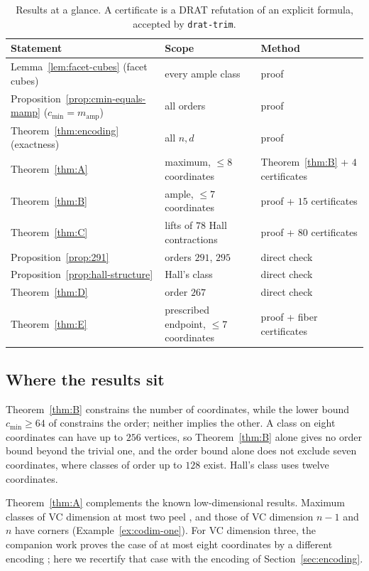 \documentclass[11pt]{article}
\numberwithin{equation}{section}
\theoremstyle{definition}
\theoremstyle{remark}
\newcommand{\cmin}{c_{\min}}
\newcommand{\mamp}{m_{\mathrm{amp}}}
\begin{document}
\begin{table}[t]
\centering
\small
\begin{tabular}{@{}p{}p{}p{}@{}}
\toprule
Statement & Scope & Method\\
\midrule
Lemma~\ref{lem:facet-cubes} (facet cubes) & every ample class & proof\\
Proposition~\ref{prop:cmin-equals-mamp} (\(\cmin=\mamp\)) & all orders & proof\\
Theorem~\ref{thm:encoding} (exactness) & all \(n,d\) & proof\\
Theorem~\ref{thm:A} & maximum, \(\le8\) coordinates & Theorem~\ref{thm:B} + \(4\) certificates\\
Theorem~\ref{thm:B} & ample, \(\le7\) coordinates & proof + \(15\) certificates\\
Theorem~\ref{thm:C} & lifts of \(78\) Hall contractions & proof + \(80\) certificates\\
Proposition~\ref{prop:291} & orders \(291\), \(295\) & direct check\\
Proposition~\ref{prop:hall-structure} & Hall's class & direct check\\
Theorem~\ref{thm:D} & order \(267\) & direct check\\
Theorem~\ref{thm:E} & prescribed endpoint, \(\le7\) coordinates & proof + fiber certificates\\
\bottomrule
\end{tabular}
\caption{Results at a glance.  A certificate is a DRAT refutation of an
explicit formula, accepted by \texttt{drat-trim}.}
\label{tab:glance}
\end{table}

\subsection{Where the results sit}

Theorem~\ref{thm:B} constrains the number of coordinates, while the lower
bound \(\cmin\ge64\) of \cite{BousquetDampReader} constrains the order;
neither implies the other.  A class on eight coordinates can have up to
\(256\) vertices, so Theorem~\ref{thm:B} alone gives no order bound beyond
the trivial one, and the order bound alone does not exclude seven
coordinates, where classes of order up to \(128\) exist.  Hall's class uses
twelve coordinates.

Theorem~\ref{thm:A} complements the known low-dimensional results.
Maximum classes of VC dimension at most two peel
\cite[Proposition~4.11]{ChalopiChepoiMoran22}, and those of VC dimension
\(n-1\) and \(n\) have corners (Example~\ref{ex:codim-one}).  For VC dimension
three, the companion work proves the case of at most eight coordinates by a
different encoding \cite{BousquetDampReader}; here we recertify that case
with the encoding of Section~\ref{sec:encoding}.
\end{document}

